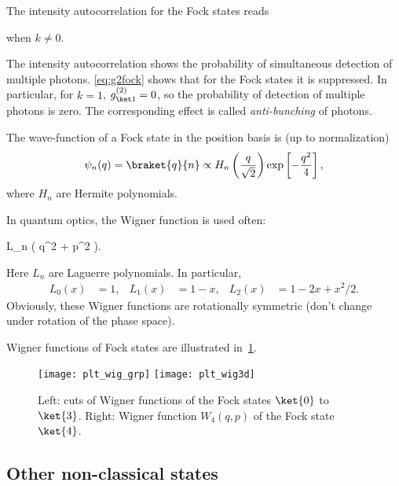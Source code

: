\documentclass[fontsize=9pt,bookmarkpackage=false]{scrartcl}
\newcommand*{\mybx}[1]{\colorbox{mygr!15}{\hspace{1em}#1\hspace{1em}}}
\begin{document}
The intensity autocorrelation for the Fock states reads
when $k \neq 0$.

The intensity autocorrelation shows the probability of simultaneous detection of multiple photons.
\cref{eq:g2fock} shows that for the Fock states it is suppressed.
In particular, for $k = 1$, $g^{(2)}_{\ket 1} = 0$, so the probability of detection of multiple photons is zero.
The corresponding effect is called \emph{anti-bunching} of photons.

The wave-function of a Fock state in the position basis is (up to normalization)
\begin{equation}
  \psi_n (q) = \braket{ q }{ n }
  \propto H_n \left( \frac{ q }{ \sqrt{ 2 }} \right)
  \exp\left[ - \frac{ q ^2 }{ 4 } \right],
\end{equation}
where $H_n$ are Hermite polynomials.

In quantum optics, the Wigner function is used often:
\begin{empheq}[box=\mybx]{equation}
  W_n (q , p ) = \frac{ ( -1 )^{-1} }{ 2 \pi }
  \exp\left[ - \frac{ q^2 + p^2 }{ 2 } \right]
  L_n ( q^2 + p^2 ).
\end{empheq}
Here $L_n$ are Laguerre polynomials.
In particular,
\begin{align}
  L_0 (x) & = 1, &
  L_1 (x) & = 1 - x, &
  L_2 (x) & = 1 - 2 x + x^2 / 2.
\end{align}
Obviously, these Wigner functions are rotationally symmetric (don't change under rotation of the phase space).

Wigner functions of Fock states are illustrated in~\cref{fig:plt_wig_fock}.

\begin{figure}[htb]
  \centering
  \texttt{[image: plt\_wig\_grp]}
  \texttt{[image: plt\_wig3d]}
  \caption{
    Left: cuts of Wigner functions of the Fock states $\ket{0}$ to $\ket{3}$.
    Right: Wigner function $W_4(q,p)$ of the Fock state $\ket{4}$.
  }
  \label{fig:plt_wig_fock}
\end{figure}

\subsection{Other non-classical states} %
\label{sec:other_non_classical_states}
\end{document}
